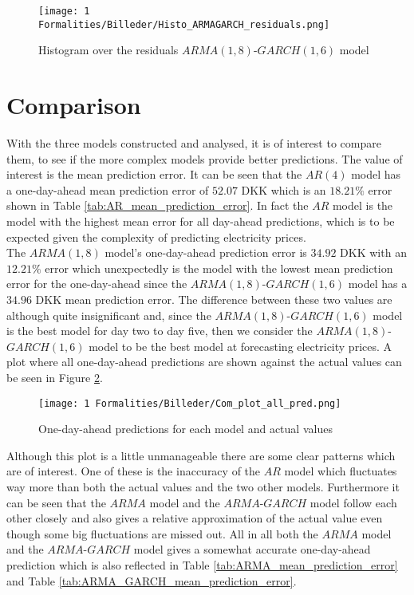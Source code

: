 \begin{equation*}
    
\end{equation*}



\begin{figure}[H]
    \centering
    \texttt{[image: 1 Formalities/Billeder/Histo\_ARMAGARCH\_residuals.png]}
    \caption{Histogram over the residuals $ARMA(1,8)$-$GARCH(1,6)$ model}
    \label{fig:Histogram_residuals_ARMA_GARCH_model}
\end{figure}

\section{Comparison}\label{sect:comp}
With the three models constructed and analysed, it is of interest to compare them, to see if the more complex models provide better predictions. The value of interest is the mean prediction error. It can be seen that the $AR(4)$ model has a one-day-ahead mean prediction error of $52.07$ DKK which is an $18.21\%$ error shown in Table \ref{tab:AR_mean_prediction_error}. In fact the $AR$ model is the model with the highest mean error for all day-ahead predictions, which is to be expected given the complexity of predicting electricity prices. \\
\noindent The $ARMA(1,8)$ model's one-day-ahead prediction error is $34.92$ DKK with an $12.21\%$ error which unexpectedly is the model with the lowest mean prediction error for the one-day-ahead since the $ARMA(1,8)$-$GARCH(1,6)$ model has a $34.96$ DKK mean prediction error. The difference between these two values are although quite insignificant and, since the $ARMA(1,8)$-$GARCH(1,6)$ model is the best model for day two to day five, then we consider the $ARMA(1,8)$-$GARCH(1,6)$ model to be the best model at forecasting electricity prices. A plot where all one-day-ahead predictions are shown against the actual values can be seen in Figure \ref{fig:One_step_pred}.
\begin{figure}[H]
    \centering
    \texttt{[image: 1 Formalities/Billeder/Com\_plot\_all\_pred.png]}
    \caption{One-day-ahead predictions for each model and actual values}
    \label{fig:One_step_pred}
\end{figure}
\noindent Although this plot is a little unmanageable there are some clear patterns which are of interest. One of these is the inaccuracy of the $AR$ model which fluctuates way more than both the actual values and the two other models. Furthermore it can be seen that the $ARMA$ model and the $ARMA$-$GARCH$ model follow each other closely and also gives a relative approximation of the actual value even though some big fluctuations are missed out. All in all both the $ARMA$ model and the $ARMA$-$GARCH$ model gives a somewhat accurate one-day-ahead prediction which is also reflected in Table \ref{tab:ARMA_mean_prediction_error} and Table \ref{tab:ARMA_GARCH_mean_prediction_error}.\\
